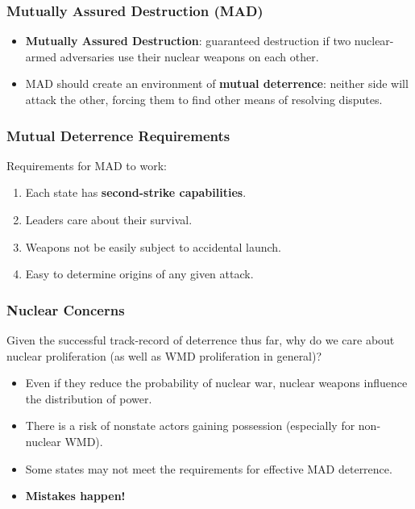 \documentclass[handout]{beamer}
\begin{document}
\begin{frame} 
	\frametitle{\LARGE{Mutually Assured Destruction (MAD)}}
	\begin{itemize}
	\item \textbf{Mutually Assured Destruction}: guaranteed destruction if two nuclear-armed adversaries use their nuclear weapons on each other. \pause
	\item MAD should create an environment of \textbf{mutual deterrence}: neither side will attack the other, forcing them to find other means of resolving disputes.
	\end{itemize}
\end{frame}

\begin{frame} 
\frametitle{\LARGE{Mutual Deterrence Requirements}}
Requirements for MAD to work: \pause
\begin{enumerate}
		\item Each state has \textbf{second-strike capabilities}. \pause
		\item Leaders care about their survival. \pause
		\item Weapons not be easily subject to accidental launch. \pause
		\item Easy to determine origins of any given attack.
\end{enumerate}
\end{frame}

\begin{frame} 
\frametitle{\LARGE{Nuclear Concerns}}
Given the successful track-record of deterrence thus far, why do we care about nuclear proliferation (as well as WMD proliferation in general)? \pause
	\begin{itemize}
		\item Even if they reduce the probability of nuclear war, nuclear weapons influence the distribution of power. \pause
		\item There is a risk of nonstate actors gaining possession (especially for non-nuclear WMD). \pause 
        \item Some states may not meet the requirements for effective MAD deterrence. \pause 		
        \item \textbf{Mistakes happen!}
\end{itemize}
\end{frame}
\end{document}
